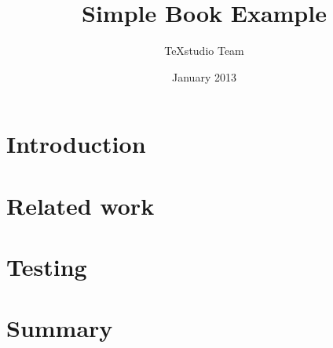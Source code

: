 \documentclass{report}
\begin{document}
	
	\author{TeXstudio Team}
	\title{Simple Book Example}
	\date{January 2013}
	
	
	\maketitle
	\tableofcontents
	
%	
%	
%

	\chapter{Introduction}
	
	
	\chapter{Related work}
	
	
	
	
	
	
	\chapter{Testing}
	
	
	\chapter{Summary}
	
	
	
\end{document}
